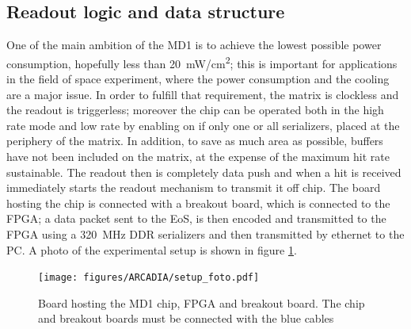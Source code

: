 \subsection{Readout logic and data structure}
    One of the main ambition of the MD1 is to achieve the lowest possible power consumption, hopefully less than \SI{20}{mW/cm\squared}; this is important for applications in the field of space experiment, where the power consumption and the cooling are a major issue. 
    In order to fulfill that requirement, the matrix is clockless and the readout is triggerless; moreover the chip can be operated both in the high rate mode and low rate by enabling on if only one or all serializers, placed at the periphery of the matrix. In addition, to save as much area as possible, buffers have not been included on the matrix, at the expense of the maximum hit rate sustainable. The readout then is completely data push and when a hit is received immediately starts the readout mechanism to transmit it off chip.
    The board hosting the chip is connected with a breakout board, which is connected to the FPGA; a data packet sent to the EoS, is then encoded and transmitted to the FPGA using a \SI{320}{MHz} DDR serializers and then transmitted by ethernet to the PC.
    A photo of the experimental setup is shown in figure \ref{fig:foto_setup}.
    \begin{figure}[h!]
        \centering
        \texttt{[image: figures/ARCADIA/setup\_foto.pdf]}
        \caption{Board hosting the MD1 chip, FPGA and breakout board. The chip and breakout boards must be connected with the blue cables}
        \label{fig:foto_setup}
    \end{figure}

